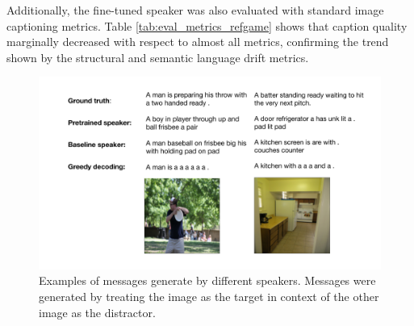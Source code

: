 Additionally, the fine-tuned speaker was also evaluated with standard image captioning metrics. Table \ref{tab:eval_metrics_refgame} shows that caption quality marginally decreased with respect to almost all metrics, confirming the trend shown by the structural and semantic language drift metrics. 

\begin{figure}[h]
	\centering
	\includegraphics[width=\linewidth]{images/example_generations/coco_speakers_randomPairs_examples.pdf}
	\caption{Examples of messages generate by different speakers. Messages were generated by treating the image as the target in context of the other image as the distractor.}
	\label{fig:coco_randPairs_speaker_generations}
\end{figure}


